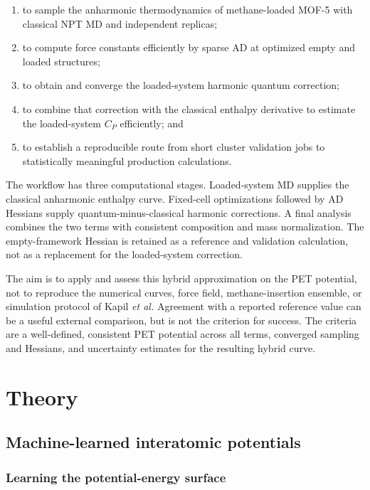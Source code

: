\documentclass[10pt,a4paper,twocolumn]{article}
\newcommand{\cpheat}{\ensuremath{C_P}}
\begin{document}
\begin{enumerate}
  \item to sample the anharmonic thermodynamics of methane-loaded MOF-5 with
        classical NPT MD and independent replicas;
  \item to compute force constants efficiently by sparse AD at optimized empty
        and loaded structures;
  \item to obtain and converge the loaded-system harmonic quantum correction;
  \item to combine that correction with the classical enthalpy derivative to
        estimate the loaded-system \cpheat{} efficiently; and
  \item to establish a reproducible route from short cluster validation jobs
        to statistically meaningful production calculations.
\end{enumerate}

The workflow has three computational stages. Loaded-system MD supplies the
classical anharmonic enthalpy curve. Fixed-cell optimizations followed by AD
Hessians supply quantum-minus-classical harmonic corrections. A final analysis
combines the two terms with consistent composition and mass normalization. The
empty-framework Hessian is retained as a reference and validation calculation,
not as a replacement for the loaded-system correction.

The aim is to apply and assess this hybrid approximation on the PET potential,
not to reproduce the numerical curves, force field, methane-insertion
ensemble, or simulation protocol of Kapil \emph{et al.} Agreement with a
reported reference value can be a useful external comparison, but is not the
criterion for success. The criteria are a well-defined, consistent PET
potential across all terms, converged sampling and Hessians, and uncertainty
estimates for the resulting hybrid curve.

\section{Theory}
\label{sec:theory}

\subsection{Machine-learned interatomic potentials}

\subsubsection{Learning the potential-energy surface}
\end{document}
